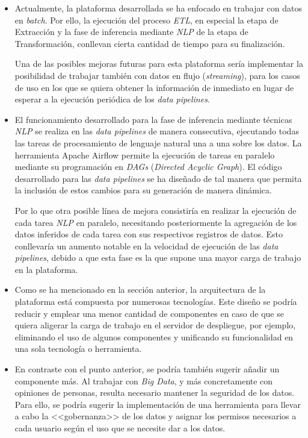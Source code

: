 \begin{itemize}
    \item Actualmente, la plataforma desarrollada se ha enfocado en trabajar con datos en \textit{batch}. Por ello, la ejecución del proceso \textit{ETL}, en especial la etapa de Extracción y la fase de inferencia mediante \textit{NLP} de la etapa de Transformación, conllevan cierta cantidad de tiempo para su finalización.
    
    Una de las posibles mejoras futuras para esta plataforma sería implementar la posibilidad de trabajar también con datos en flujo (\textit{streaming}), para los casos de uso en los que se quiera obtener la información de inmediato en lugar de esperar a la ejecución periódica de los \textit{data pipelines}.

    \item El funcionamiento desarrollado para la fase de inferencia mediante técnicas \textit{NLP} se realiza en las \textit{data pipelines} de manera consecutiva, ejecutando todas las tareas de procesamiento de lenguaje natural una a una sobre los datos. La herramienta Apache Airflow permite la ejecución de tareas en paralelo mediante su programación en \textit{DAGs} (\textit{Directed Acyclic Graph}). El código desarrollado para las \textit{data pipelines} se ha diseñado de tal manera que permita la inclusión de estos cambios para su generación de manera dinámica.
    
    Por lo que otra posible línea de mejora consistiría en realizar la ejecución de cada tarea \textit{NLP} en paralelo, necesitando posteriormente la agregación de los datos inferidos de cada tarea con sus respectivos registros de datos. Esto conllevaría un aumento notable en la velocidad de ejecución de las \textit{data pipelines}, debido a que esta fase es la que supone una mayor carga de trabajo en la plataforma.

    \item Como se ha mencionado en la sección anterior, la arquitectura de la plataforma está compuesta por numerosas tecnologías. Este diseño se podría reducir y emplear una menor cantidad de componentes en caso de que se quiera aligerar la carga de trabajo en el servidor de despliegue, por ejemplo, eliminando el uso de algunos componentes y unificando su funcionalidad en una sola tecnología o herramienta.

    \item En contraste con el punto anterior, se podría también sugerir añadir un componente más. Al trabajar con \textit{Big Data}, y más concretamente con opiniones de personas, resulta necesario mantener la seguridad de los datos. Para ello, se podría sugerir la implementación de una herramienta para llevar a cabo la <<gobernanza>> de los datos y asignar los permisos necesarios a cada usuario según el uso que se necesite dar a los datos.


\end{itemize}

